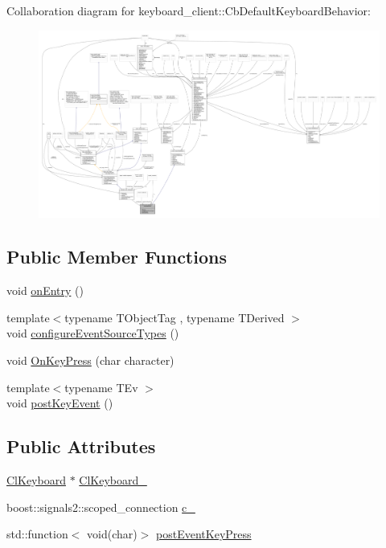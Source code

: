 Collaboration diagram for keyboard\+\_\+client\+:\+:Cb\+Default\+Keyboard\+Behavior\+:\nopagebreak
\begin{figure}[H]
\begin{center}
\leavevmode
\includegraphics[width=350pt]{classkeyboard__client_1_1CbDefaultKeyboardBehavior__coll__graph}
\end{center}
\end{figure}
\subsection*{Public Member Functions}
\begin{DoxyCompactItemize}
\item 
void \hyperlink{classkeyboard__client_1_1CbDefaultKeyboardBehavior_a1ac673a9d9a733215f665810d6cf69aa}{on\+Entry} ()
\item 
{\footnotesize template$<$typename T\+Object\+Tag , typename T\+Derived $>$ }\\void \hyperlink{classkeyboard__client_1_1CbDefaultKeyboardBehavior_a70465c0886d118d226d136a4acc63ef3}{configure\+Event\+Source\+Types} ()
\item 
void \hyperlink{classkeyboard__client_1_1CbDefaultKeyboardBehavior_ae6b6fa6b648a503f2a55eccde8556daa}{On\+Key\+Press} (char character)
\item 
{\footnotesize template$<$typename T\+Ev $>$ }\\void \hyperlink{classkeyboard__client_1_1CbDefaultKeyboardBehavior_ae02c14e58b7348af59f3f82bfadbbbdd}{post\+Key\+Event} ()
\end{DoxyCompactItemize}
\subsection*{Public Attributes}
\begin{DoxyCompactItemize}
\item 
\hyperlink{classkeyboard__client_1_1ClKeyboard}{Cl\+Keyboard} $\ast$ \hyperlink{classkeyboard__client_1_1CbDefaultKeyboardBehavior_a17c088cabe2d686f227d2a6368629993}{Cl\+Keyboard\+\_\+}
\item 
boost\+::signals2\+::scoped\+\_\+connection \hyperlink{classkeyboard__client_1_1CbDefaultKeyboardBehavior_a4872d81538980d9a706cc271902097f1}{c\+\_\+}
\item 
std\+::function$<$ void(char)$>$ \hyperlink{classkeyboard__client_1_1CbDefaultKeyboardBehavior_ac3a5e8c2cca0fd4117ddc192858d3771}{post\+Event\+Key\+Press}
\end{DoxyCompactItemize}


